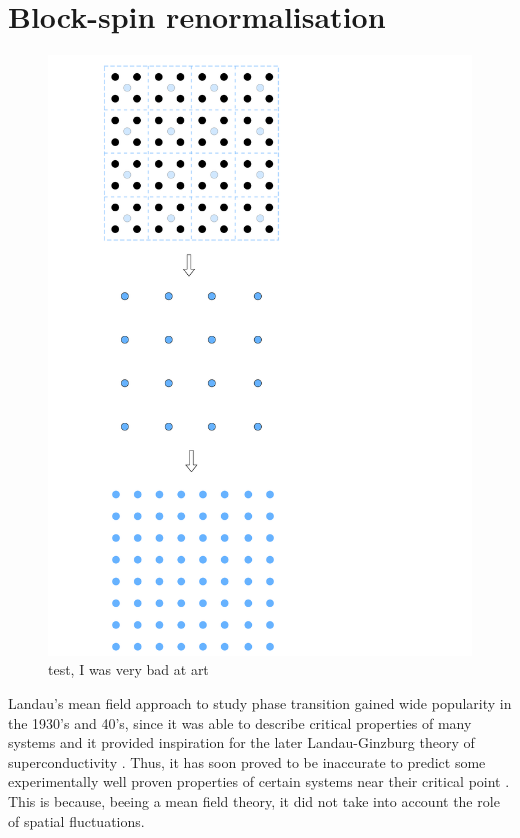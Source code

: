 \section{Block-spin renormalisation}
\label{sec:blockspin}
\begin{figure}
    \centering 
    \includegraphics[angle=90,scale=0.34]{figures/test.pdf}
    \caption{test, I was very bad at art}
    \label{fig:blockin_first}
\end{figure}
Landau's mean field approach to study phase transition \cite{Landau:1937obd} gained wide popularity in the 1930's and 40's, since it was able to describe critical properties of many systems and it provided inspiration for the later Landau-Ginzburg theory of superconductivity \cite{ginzburg}. Thus, it has soon proved to be inaccurate to predict some experimentally well proven properties of certain systems near their critical point \cite{Cao:1999pw}. This is because, beeing a mean field theory, it did not take into account the role of spatial fluctuations.
